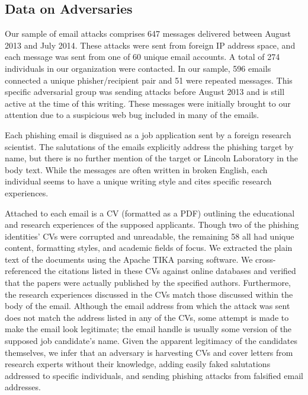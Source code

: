 \documentclass[conference]{IEEEtran}
\begin{document}
\subsection{Data on Adversaries}

Our sample of email attacks comprises 647 messages delivered between August 2013 and July 2014.  These attacks were sent from foreign IP address space, and each message 
was sent from one of 60 unique email accounts.  A total of 274 individuals in our organization were contacted.  In our sample, 596 emails connected a unique phisher/recipient pair and 51 were 
repeated messages.  This specific adversarial group was sending attacks before August 2013 and is still active at the time of this writing.  These messages were initially brought to our attention due to a 
suspicious web bug included in many of the emails.

Each phishing email is disguised as a job application sent by a foreign research scientist.  The salutations of the emails explicitly address the phishing target 
by name, but there is no further mention of the target or Lincoln Laboratory in the body text.  While the messages are often written in broken English, each individual seems to have a unique writing style and cites 
specific research experiences.

Attached to each email is a CV (formatted as a PDF) outlining the educational and research experiences of the supposed applicants.  
Though two of the phishing identities' CVs were corrupted and unreadable, the remaining 58 all had unique content, formatting styles, and academic fields of focus.  We extracted the plain 
text of the documents using the Apache TIKA \cite{Tika} 
parsing software.  We cross-referenced the citations listed in these CVs against online databases and verified 
that the papers were actually published by the specified authors.  Furthermore, the research experiences discussed in the CVs match those discussed within the body of the email.  Although the email address 
from which the attack was sent does not match the address listed in any of the CVs, some attempt is made to make the email look legitimate; the email handle is usually some version of the supposed job 
candidate's name.  Given the apparent legitimacy of the candidates themselves, we infer that an adversary is harvesting CVs and cover letters from research experts without their knowledge, adding easily 
faked salutations addressed to specific individuals, and sending phishing attacks from falsified email addresses.
\end{document}
